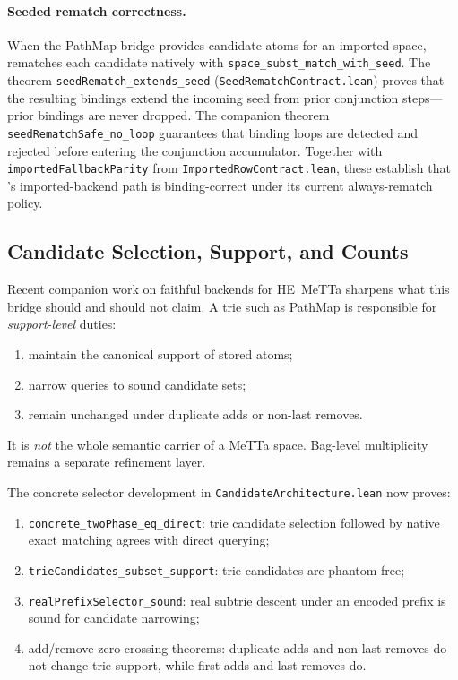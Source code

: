 \documentclass[11pt]{article}
\theoremstyle{definition}
\theoremstyle{remark}
\newcommand{\MeTTa}{\textup{MeTTa}}
\newcommand{\HE}{\textup{HE}}
\newcommand{\PathMap}{\textup{PathMap}}
\begin{document}
\paragraph{Seeded rematch correctness.}
When the PathMap bridge provides candidate atoms for an imported space,
\CeTTa{} rematches each candidate natively with \texttt{space\_subst\_match\_with\_seed}.
The theorem \texttt{seedRematch\_extends\_seed} (\texttt{SeedRematchContract.lean})
proves that the resulting bindings extend the incoming seed from prior
conjunction steps---prior bindings are never dropped.  The companion theorem
\texttt{seedRematchSafe\_no\_loop} guarantees that binding loops are detected
and rejected before entering the conjunction accumulator.  Together with
\texttt{importedFallbackParity} from \texttt{ImportedRowContract.lean},
these establish that \CeTTa{}'s imported-backend path is binding-correct
under its current always-rematch policy.

\subsection{Candidate Selection, Support, and Counts}

Recent companion work on faithful backends for \HE{}~\MeTTa{} sharpens what
this bridge should and should not claim.  A trie such as \PathMap{} is
responsible for \emph{support-level} duties:
\begin{enumerate}[nosep]
  \item maintain the canonical support of stored atoms;
  \item narrow queries to sound candidate sets;
  \item remain unchanged under duplicate adds or non-last removes.
\end{enumerate}
It is \emph{not} the whole semantic carrier of a MeTTa space.  Bag-level
multiplicity remains a separate refinement layer.

The concrete selector development in
\texttt{CandidateArchitecture.lean} now proves:
\begin{enumerate}[nosep]
  \item \texttt{concrete\_twoPhase\_eq\_direct}: trie candidate selection
        followed by native exact matching agrees with direct querying;
  \item \texttt{trieCandidates\_subset\_support}: trie candidates are
        phantom-free;
  \item \texttt{realPrefixSelector\_sound}: real subtrie descent under an
        encoded prefix is sound for candidate narrowing;
  \item add/remove zero-crossing theorems: duplicate adds and non-last
        removes do not change trie support, while first adds and last
        removes do.
\end{enumerate}
\end{document}

